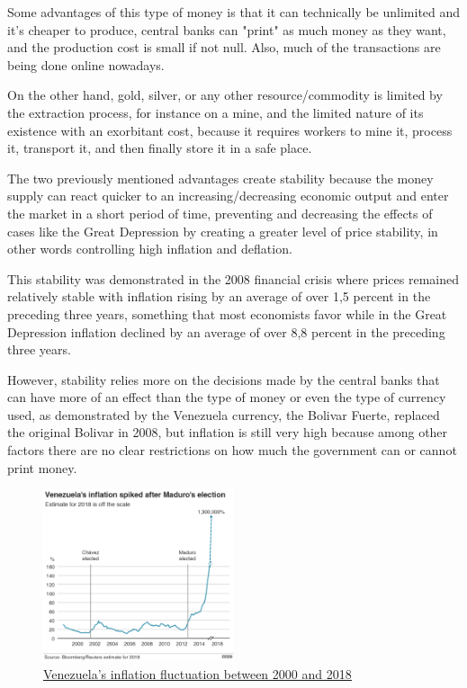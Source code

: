 \documentclass{article}
\begin{document}
Some advantages of this type of money is that it can technically be unlimited and it's cheaper to produce, central banks can "print" as much money as they want, and the production cost is small if not null. Also, much of the transactions are being done online nowadays.

On the other hand, gold, silver, or any other resource/commodity is limited by the extraction process, for instance on a mine, and the limited nature of its existence with an exorbitant cost, because it requires workers to mine it, process it, transport it, and then finally store it in a safe place.

The two previously mentioned advantages create stability because the money supply can react quicker to an increasing/decreasing economic output and enter the market in a short period of time, preventing and decreasing the effects of cases like the Great Depression by creating a greater level of price stability, in other words controlling high inflation and deflation.

This stability was demonstrated in the 2008 financial crisis where prices remained relatively stable with inflation rising by an average of over 1,5 percent in the preceding three years, something that most economists favor while in the Great Depression inflation declined by an average of over 8,8 percent in the preceding three years.

However, stability relies more on the decisions made by the central banks that can have more of an effect than the type of money or even the type of currency used, as demonstrated by the Venezuela currency, the Bolivar Fuerte, replaced the original Bolivar in 2008, but inflation is still very high because among other factors there are no clear restrictions on how much the government can or cannot print money.

\begin{figure}[H]
    \begin{center}
        \includegraphics[width=0.5\textwidth]{images/venezuela_inflation.png}
        \caption{\href{https://ichef.bbci.co.uk/news/640/cpsprodpb/7822/production/_105345703_venezuela-inflation_v3_976-nc.png}{\underline{Venezuela's inflation fluctuation between 2000 and 2018}}}
    \end{center}
\end{figure}
\end{document}
